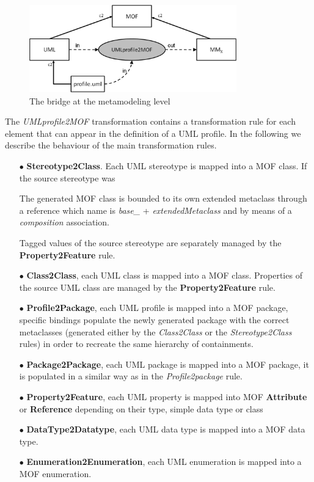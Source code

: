 \begin{figure}[htbp]
	\centering
		\includegraphics[width=0.80\textwidth]{figures/metamodelingLevel.png}
	\caption{The bridge at the metamodeling level}
	\label{fig:metamodelingLevel}
\end{figure}
%
The \textit{UMLprofile2MOF} transformation contains a transformation rule for each element that can appear in the definition of a UML profile.
In the following we describe the behaviour of the main transformation rules.

\begin{itemize}
	\item[$\bullet$] \textbf{Stereotype2Class}. Each UML stereotype is mapped into a MOF class. If the source stereotype was 
	
	The generated MOF class is bounded to its own extended metaclass through a reference which name is \textit{base\_} + \textit{extendedMetaclass} and by means of a \textit{composition} association.   
	
	Tagged values of the source stereotype are separately managed by the \textbf{Property2Feature} rule.
	\item[$\bullet$] \textbf{Class2Class}, each UML class is mapped into a MOF class. 
	Properties of the source UML class are managed by the \textbf{Property2Feature} rule.
	\item[$\bullet$] \textbf{Profile2Package}, each UML profile is mapped into a MOF package, specific bindings populate the newly generated 
	package with the correct metaclasses (generated either by the \textit{Class2Class} or the \textit{Stereotype2Class} rules) in order to
	recreate the same hierarchy of containments.
	\item[$\bullet$] \textbf{Package2Package}, each UML package is mapped into a MOF package, 
	it is populated in a similar way as in the \textit{Profile2package} rule.
	\item[$\bullet$] \textbf{Property2Feature}, each UML property is mapped into MOF \textbf{Attribute} or \textbf{Reference}
	depending on their type, simple data type or class 
	\item[$\bullet$] \textbf{DataType2Datatype}, each UML data type is mapped into a MOF data type.
	\item[$\bullet$] \textbf{Enumeration2Enumeration}, each UML enumeration is mapped into a MOF enumeration.
\end{itemize}


